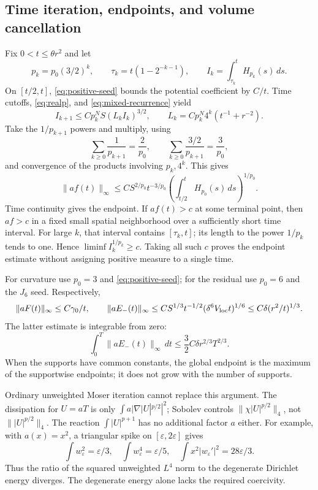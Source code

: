 \documentclass[a4paper,11pt]{article}
\numberwithin{equation}{section}
\theoremstyle{definition}
\begin{document}
\subsection{Time iteration, endpoints, and volume cancellation}
Fix $0<t\le\theta r^2$ and let
\[
p_k=p_0(3/2)^k,\qquad
\tau_k=t(1-2^{-k-1}),\qquad
I_k=\int_{\tau_k}^{t}H_{p_k}(s)\,ds.
\]
On $[t/2,t]$, \eqref{eq:positive-seed} bounds the potential coefficient by $C/t$.
Time cutoffs, \eqref{eq:realp}, and \eqref{eq:mixed-recurrence} yield
\[
I_{k+1}\le Cp_k^N S(L_kI_k)^{3/2},\qquad
L_k=Cp_k^N4^k(t^{-1}+r^{-2}).
\]
Take the $1/p_{k+1}$ powers and multiply, using
\[
\sum_{k\ge0}\frac1{p_{k+1}}=\frac2{p_0},\qquad
\sum_{k\ge0}\frac{3/2}{p_{k+1}}=\frac3{p_0},
\]
and convergence of the products involving $p_k,4^k$. This gives
\begin{equation}\label{eq:weighted-endpoint}
\|af(t)\|_\infty
\le CS^{2/p_0}t^{-3/p_0}
\left(\int_{t/2}^{t}H_{p_0}(s)\,ds\right)^{1/p_0}.
\end{equation}
Time continuity gives the endpoint. If $af(t)>c$ at some terminal point, then $af>c$ in a fixed small spatial neighborhood over a sufficiently short time interval. For large $k$, that interval contains $[\tau_k,t]$; its length to the power $1/p_k$ tends to one. Hence $\liminf I_k^{1/p_k}\ge c$. Taking all such $c$ proves the endpoint estimate without assigning positive measure to a single time.

For curvature use $p_0=3$ and \eqref{eq:positive-seed}; for the residual use $p_0=6$ and the $J_6$ seed. Respectively,
\[
\|aF(t)\|_\infty\le C\gamma_0/t,\qquad
\|aE_-(t)\|_\infty
\le CS^{1/3}t^{-1/2}(\delta^6V_{\rm loc}t)^{1/6}
\le C\delta(r^2/t)^{1/3}.
\]
The latter estimate is integrable from zero:
\[
\int_0^T\|aE_-(t)\|_\infty\,dt
\le\frac32C\delta r^{2/3}T^{2/3}.
\]
When the supports have common constants, the global endpoint is the maximum of the supportwise endpoints; it does not grow with the number of supports.

Ordinary unweighted Moser iteration cannot replace this argument. The dissipation for $U=aT$ is only
$\int a|\nabla|U|^{p/2}|^2$; Sobolev controls
$\|\chi|U|^{p/2}\|_4$, not $\||U|^{p/2}\|_4$.
The reaction $\int|U|^{p+1}$ has no additional factor $a$ either.
For example, with $a(x)=x^2$, a triangular spike on $[\varepsilon,2\varepsilon]$ gives
\[
\int w_\varepsilon^2=\varepsilon/3,\quad
\int w_\varepsilon^4=\varepsilon/5,\quad
\int x^2|w_\varepsilon'|^2=28\varepsilon/3.
\]
Thus the ratio of the squared unweighted $L^4$ norm to the degenerate Dirichlet energy diverges.
The degenerate energy alone lacks the required coercivity.
\end{document}
